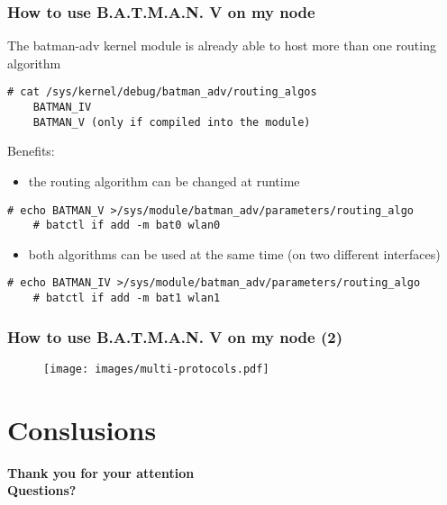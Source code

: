 \documentclass[slidestop]{beamer}
\begin{document}
\begin{frame}[c,fragile]
	\frametitle{How to use B.A.T.M.A.N. V on my node}
	The batman-adv kernel module is already able to host more than one
	routing algorithm
	\pause
	\begin{lstlisting}[basicstyle=\scriptsize]
	# cat /sys/kernel/debug/batman_adv/routing_algos
	BATMAN_IV
	BATMAN_V (only if compiled into the module)
	\end{lstlisting}
	\pause
	Benefits:
	\begin{itemize}
		\item the routing algorithm can be changed at runtime
	\end{itemize}
	\pause
	\begin{lstlisting}[basicstyle=\scriptsize]
	# echo BATMAN_V >/sys/module/batman_adv/parameters/routing_algo
	# batctl if add -m bat0 wlan0
	\end{lstlisting}
	\pause
	\begin{itemize}
		\item both algorithms can be used at the same time (on two
			different interfaces)
	\end{itemize}
	\begin{lstlisting}[basicstyle=\scriptsize]
	# echo BATMAN_IV >/sys/module/batman_adv/parameters/routing_algo
	# batctl if add -m bat1 wlan1
	\end{lstlisting}
\end{frame}

\begin{frame}[c]
	\frametitle{How to use B.A.T.M.A.N. V on my node (2)}
	\begin{figure}
		\centering
		\texttt{[image: images/multi-protocols.pdf]}
	\end{figure}
\end{frame}

\section{Conslusions}

\begin{frame}[c]
	\begin{center}
	\Large{\textbf{Thank you for your attention\\[1cm]
	Questions?}}
	\end{center}
\end{frame}
\end{document}

